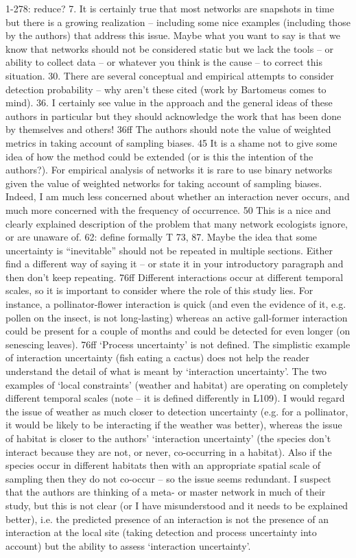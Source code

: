 1-278: reduce?
7.  It is certainly true that most networks are snapshots in time but there is a growing realization – including some nice examples (including those by the authors) that address this issue.  Maybe what you want to say is that we know that networks should not be considered static but we lack the tools – or ability to collect data – or whatever you think is the cause – to correct this situation. 
30.  There are several conceptual and empirical attempts to consider detection probability – why aren’t these cited (work by Bartomeus comes to mind).
36.  I certainly see value in the approach and the general ideas of these authors in particular but they should acknowledge the work that has been done by themselves and others!
36ff The authors should note the value of weighted metrics in taking account of sampling biases.
45 It is a shame not to give some idea of how the method could be extended (or is this the intention of the authors?). For empirical analysis of networks it is rare to use binary networks given the value of weighted networks for taking account of sampling biases. Indeed, I am much less concerned about whether an interaction never occurs, and much more concerned with the frequency of occurrence.
50 This is a nice and clearly explained description of the problem that many network ecologists ignore, or are unaware of.
62: define formally T
73, 87.  Maybe the idea that some uncertainty is “inevitable” should not be repeated in multiple sections.  Either find a different way of saying it – or state it in your introductory paragraph and then don’t keep repeating.
76ff Different interactions occur at different temporal scales, so it is important to consider where the role of this study lies. For instance, a pollinator-flower interaction is quick (and even the evidence of it, e.g. pollen on the insect, is not long-lasting) whereas an active gall-former interaction could be present for a couple of months and could be detected for even longer (on senescing leaves).
76ff ‘Process uncertainty’ is not defined. The simplistic example of interaction uncertainty (fish eating a cactus) does not help the reader understand the detail of what is meant by ‘interaction uncertainty’. The two examples of ‘local constraints’ (weather and habitat) are operating on completely different temporal scales (note – it is defined differently in L109). I would regard the issue of weather as much closer to detection uncertainty (e.g. for a pollinator, it would be likely to be interacting if the weather was better), whereas the issue of habitat is closer to the authors’ ‘interaction uncertainty’ (the species don’t interact because they are not, or never, co-occurring in a habitat). Also if the species occur in different habitats then with an appropriate spatial scale of sampling then they do not co-occur – so the issue seems redundant. I suspect that the authors are thinking of a meta- or master network in much of their study, but this is not clear (or I have misunderstood and it needs to be explained better), i.e. the predicted presence of an interaction is not the presence of an interaction at the local site (taking detection and process uncertainty into account) but the ability to assess ‘interaction uncertainty’.
